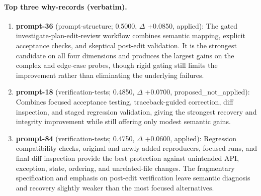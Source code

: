 \paragraph{Top three why-records (verbatim).}\begin{enumerate}\itemsep1pt
\item \textbf{prompt-36} (prompt-structure; 0.5000, $\Delta$ +0.0850, applied): The gated investigate-plan-edit-review workflow combines semantic mapping, explicit acceptance checks, and skeptical post-edit validation. It is the strongest candidate on all four dimensions and produces the largest gains on the complex and edge-case probes, though rigid gating still limits the improvement rather than eliminating the underlying failures.
\item \textbf{prompt-18} (verification-tests; 0.4850, $\Delta$ +0.0700, proposed\_not\_applied): Combines focused acceptance testing, traceback-guided correction, diff inspection, and staged regression validation, giving the strongest recovery and integrity improvement while still offering only modest semantic gains.
\item \textbf{prompt-84} (verification-tests; 0.4750, $\Delta$ +0.0600, applied): Regression compatibility checks, original and newly added reproducers, focused runs, and final diff inspection provide the best protection against unintended API, exception, state, ordering, and unrelated-file changes. The fragmentary specification and emphasis on post-edit verification leave semantic diagnosis and recovery slightly weaker than the most focused alternatives.
\end{enumerate}

